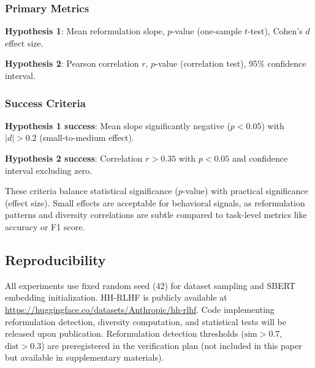 \subsubsection{Primary Metrics}

\textbf{Hypothesis 1}: Mean reformulation slope, $p$-value (one-sample $t$-test), Cohen's $d$ effect size.

\textbf{Hypothesis 2}: Pearson correlation $r$, $p$-value (correlation test), 95\% confidence interval.

\subsubsection{Success Criteria}

\textbf{Hypothesis 1 success}: Mean slope significantly negative ($p < 0.05$) with $|d| > 0.2$ (small-to-medium effect).

\textbf{Hypothesis 2 success}: Correlation $r > 0.35$ with $p < 0.05$ and confidence interval excluding zero.

These criteria balance statistical significance ($p$-value) with practical significance (effect size). Small effects are acceptable for behavioral signals, as reformulation patterns and diversity correlations are subtle compared to task-level metrics like accuracy or F1 score.

\subsection{Reproducibility}

All experiments use fixed random seed (42) for dataset sampling and SBERT embedding initialization. HH-RLHF is publicly available at \url{https://huggingface.co/datasets/Anthropic/hh-rlhf}. Code implementing reformulation detection, diversity computation, and statistical tests will be released upon publication. Reformulation detection thresholds ($\text{sim} > 0.7$, $\text{dist} > 0.3$) are preregistered in the verification plan (not included in this paper but available in supplementary materials).
